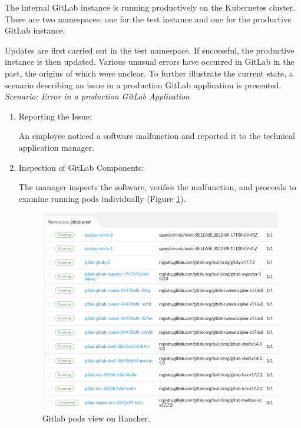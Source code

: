 \documentclass[../main.tex]{subfiles}
\begin{document}
The internal GitLab instance is running productively on the Kubernetes cluster. There are two namespaces: one for the test instance and one for the productive GitLab instance. 

Updates are first carried out in the test namespace. If successful, the productive instance is then updated. Various unusual errors have occurred in GitLab in the past, the origins of which were unclear. To further illustrate the current state, a scenario describing an issue in a production GitLab application is presented. \\

\textit{Scenario: Error in a production GitLab Application}

\begin{enumerate}
    \item Reporting the Issue: 
    
    An employee noticed a software malfunction and reported it to the technical application manager.
    
    \item Inspection of GitLab Components: 
    
    The manager inspects the software, verifies the malfunction, and proceeds to examine running pods individually (Figure \ref{fig:gitlab}).
    
    \begin{figure}[H]
        \centering
        \includegraphics[]{img/3-background/gitlab/gitlab.png}
        \caption{Gitlab pods view on Rancher.}
        \label{fig:gitlab}
    \end{figure}
    

\end{enumerate}
\end{document}
